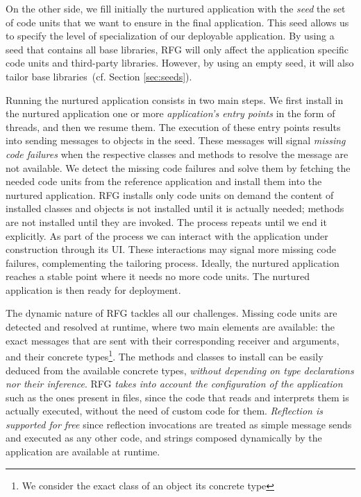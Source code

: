 On the other side, we fill initially the nurtured application with the \emph{seed} \ie the set of code units that we want to ensure in the final application. This seed allows us to specify the level of specialization of our deployable application.
By using a seed that contains all base libraries, RFG will only affect the application specific code units and third-party libraries.
However, by using an empty seed, it will also tailor base libraries~(cf. Section \ref{sec:seeds}).

Running the nurtured application consists in two main steps. We first install in the nurtured application one or more \emph{application's entry points} in the form of threads, and then we resume them.
The execution of these entry points results into sending messages to objects in the seed. These messages will signal \emph{missing code failures} when the respective classes and methods to resolve the message are not available.
We detect the missing code failures and solve them by fetching the needed code units from the reference application and install them into the nurtured application. RFG installs only code units on demand \ie the content of installed classes and objects is not installed until it is actually needed; methods are not installed until they are invoked.
The process repeats until we end it explicitly. As part of the process we can interact with the application under construction through \eg its UI. These interactions may signal more missing code failures, complementing the tailoring process. Ideally, the nurtured application reaches a stable point where it needs no more code units.
The nurtured application is then ready for deployment.

The dynamic nature of RFG tackles all our challenges. Missing code units are detected and resolved at runtime, where two main elements are available: the exact messages that are sent with their corresponding receiver and arguments, and their concrete types\footnote{We consider the exact class of an object its concrete type}. The methods and classes to install can be easily deduced from the available concrete types, \emph{without depending on type declarations nor their inference}. RFG \emph{takes into account the configuration of the application} such as the ones present in files, since the code that reads and interprets them is actually executed, without the need of custom code for them. \emph{Reflection is supported for free} since reflection invocations are treated as simple message sends and executed as any other code, and strings composed dynamically by the application are available at runtime. 


